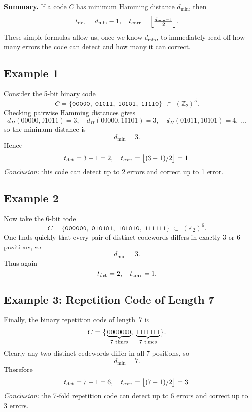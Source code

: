 \documentclass[docmute]{article}
\begin{document}
\medskip

\noindent\textbf{Summary.}  If a code \(C\) has minimum Hamming distance \(d_{\min}\), then
\[
  t_{\rm det} = d_{\min} - 1,
  \quad
  t_{\rm corr} = \Bigl\lfloor \tfrac{d_{\min}-1}{2}\Bigr\rfloor.
\]
These simple formulas allow us, once we know \(d_{\min}\), to immediately read off how many errors the code can detect and how many it can correct.

\subsection*{Example 1}

\noindent Consider the 5-bit binary code
\[
  C = \bigl\{\texttt{00000},\;\texttt{01011},\;\texttt{10101},\;\texttt{11110}\bigr\}
  \;\subset\;(\mathbb{Z}_2)^5.
\]
Checking pairwise Hamming distances gives
\[
  d_H(00000,01011)=3,\quad
  d_H(00000,10101)=3,\quad
  d_H(01011,10101)=4,\;\ldots
\]
so the minimum distance is
\[
  d_{\min}=3.
\]
Hence
\[
  t_{\rm det}=3-1=2,
  \quad
  t_{\rm corr}=\bigl\lfloor(3-1)/2\bigr\rfloor=1.
\]
\emph{Conclusion:} this code can detect up to 2 errors and correct up to 1 error.

\subsection*{Example 2}

\noindent Now take the 6-bit code
\[
  C = \bigl\{\texttt{000000},\;\texttt{010101},\;\texttt{101010},\;\texttt{111111}\bigr\}
  \;\subset\;(\mathbb{Z}_2)^6.
\]
One finds quickly that every pair of distinct codewords differs in exactly 3 or 6 positions, so
\[
  d_{\min}=3.
\]
Thus again
\[
  t_{\rm det}=2,
  \quad
  t_{\rm corr}=1.
\]

\subsection*{Example 3: Repetition Code of Length 7}

\noindent Finally, the binary repetition code of length~7 is
\[
  C = \bigl\{\,\underbrace{0000000}_{7\rm\ times},\;
                 \underbrace{1111111}_{7\rm\ times}\bigr\}.
\]
Clearly any two distinct codewords differ in all 7 positions, so
\[
  d_{\min}=7.
\]
Therefore
\[
  t_{\rm det}=7-1=6,
  \quad
  t_{\rm corr}=\bigl\lfloor(7-1)/2\bigr\rfloor=3.
\]
\emph{Conclusion:} the 7-fold repetition code can detect up to 6 errors and correct up to 3 errors.
\end{document}
